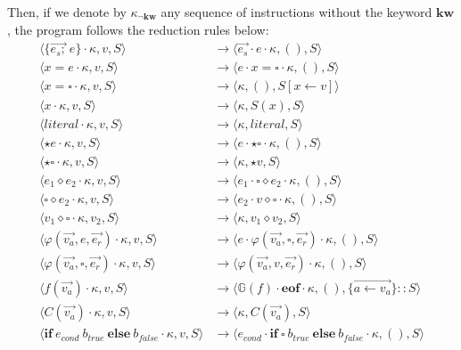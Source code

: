 \documentclass[a4paper,11pt]{article}
\newcommand\rtstate[3]{\langle #1, #2, #3\rangle}
\begin{document}
Then, if we denote by $\kappa_{\neg \mathbf{kw}}$ any sequence of instructions without the keyword $\mathbf{kw}$, the program follows the reduction rules below:
\begin{align*}
\rtstate{\{\overrightarrow{e_s;}\ e\} \cdot \kappa}{v}{S} &\rightarrow \rtstate{\overrightarrow{e_s} \cdot e \cdot \kappa}{()}{S}\\
\rtstate{x = e \cdot \kappa}{v}{S} &\rightarrow \rtstate{e \cdot x = \square \cdot \kappa}{()}{S}\\
\rtstate{x = \square \cdot \kappa}{v}{S} &\rightarrow \rtstate{\kappa}{()}{S[x \leftarrow v]}\\
\rtstate{x \cdot \kappa}{v}{S} &\rightarrow \rtstate{\kappa}{S(x)}{S}\\
\rtstate{literal \cdot \kappa}{v}{S} &\rightarrow \rtstate{\kappa}{literal}{S}\\
\rtstate{\star e \cdot \kappa}{v}{S} &\rightarrow \rtstate{e \cdot \star \square \cdot \kappa}{()}{S}\\
\rtstate{\star \square \cdot \kappa}{v}{S} &\rightarrow \rtstate{\kappa}{\star v}{S}\\
\rtstate{e_1 \diamond e_2 \cdot \kappa}{v}{S} &\rightarrow \rtstate{e_1 \cdot \square \diamond e_2 \cdot \kappa}{()}{S}\\
\rtstate{\square \diamond e_2 \cdot \kappa}{v}{S} &\rightarrow \rtstate{e_2 \cdot v \diamond \square \cdot \kappa}{()}{S}\\
\rtstate{v_1 \diamond \square \cdot \kappa}{v_2}{S} &\rightarrow \rtstate{\kappa}{v_1 \diamond v_2}{S}\\
\rtstate{\varphi(\overrightarrow{v_a}, e, \overrightarrow{e_r}) \cdot \kappa}{v}{S} &\rightarrow \rtstate{e \cdot \varphi(\overrightarrow{v_a}, \square, \overrightarrow{e_r}) \cdot \kappa}{()}{S}\\
\rtstate{\varphi(\overrightarrow{v_a}, \square, \overrightarrow{e_r}) \cdot \kappa}{v}{S} &\rightarrow \rtstate{\varphi(\overrightarrow{v_a}, v, \overrightarrow{e_r}) \cdot \kappa}{()}{S}\\
\rtstate{f(\overrightarrow{v_a}) \cdot \kappa}{v}{S} &\rightarrow \rtstate{\mathbb{G}(f) \cdot \mathbf{eof} \cdot \kappa}{()}{\{\overrightarrow{a \leftarrow v_a}\} :: S}\\
\rtstate{C(\overrightarrow{v_a}) \cdot \kappa}{v}{S} &\rightarrow \rtstate{\kappa}{C(\overrightarrow{v_a})}{S}\\
\rtstate{\mathbf{if}\ e_{cond}\ b_{true}\ \mathbf{else}\ b_{false} \cdot  \kappa}{v}{S} &\rightarrow \rtstate{e_{cond} \cdot \mathbf{if}\ \square\ b_{true}\ \mathbf{else}\ b_{false} \cdot \kappa}{()}{S}\\

\end{align*}
\end{document}
